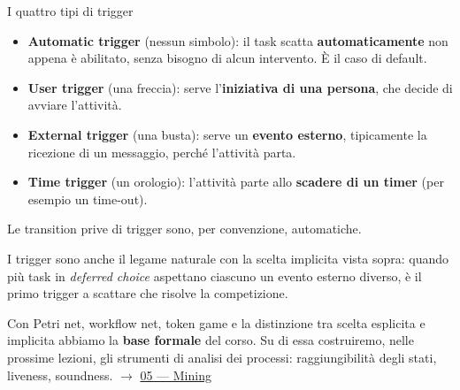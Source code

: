 \begin{boxdefinition}{I quattro tipi di trigger}
\begin{itemize}
\item \textbf{Automatic trigger} (nessun simbolo): il task scatta \textbf{automaticamente} non appena è abilitato, senza bisogno di alcun intervento. È il caso di default.
\item \textbf{User trigger} (una freccia): serve l'\textbf{iniziativa di una persona}, che decide di avviare l'attività.
\item \textbf{External trigger} (una busta): serve un \textbf{evento esterno}, tipicamente la ricezione di un messaggio, perché l'attività parta.
\item \textbf{Time trigger} (un orologio): l'attività parte allo \textbf{scadere di un timer} (per esempio un time-out).
\end{itemize}

Le transition prive di trigger sono, per convenzione, automatiche.
\end{boxdefinition}

I trigger sono anche il legame naturale con la scelta implicita vista sopra: quando più task in \emph{deferred choice} aspettano ciascuno un evento esterno diverso, è il primo trigger a scattare che risolve la competizione.

Con Petri net, workflow net, token game e la distinzione tra scelta esplicita e implicita abbiamo la \textbf{base formale} del corso. Su di essa costruiremo, nelle prossime lezioni, gli strumenti di analisi dei processi: raggiungibilità degli stati, liveness, soundness. $\rightarrow$ \hyperref[ch:05]{05 — Mining}